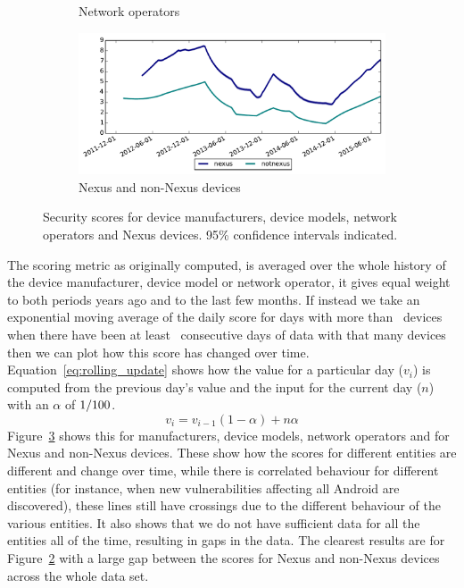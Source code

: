 \begin{figure}
\begin{subfigure}{\columnwidth}
\caption{Network operators}
\label{fig:security_score_operator}
\end{subfigure}
%
\begin{subfigure}{\columnwidth}
\includegraphics[width=\columnwidth]{figures/security_score_summary}
\caption{Nexus and non-Nexus devices}
\label{fig:security_score_summary}
\end{subfigure}
\caption{Security scores for device manufacturers, device models, network operators and Nexus devices. 95\% confidence intervals indicated.}
\label{fig:security_scores}
\end{figure}
The scoring metric as originally computed, is averaged over the whole history of the device manufacturer, device model or network operator, it gives equal weight to both periods years ago and to the last few months.
If instead we take an exponential moving average of the daily score for days with more than \daSigNumDevicesDay\, devices when there have been at least \daSigNumDays\ consecutive days of data with that many devices then we can plot how this score has changed over time.
Equation~\ref{eq:rolling_update} shows how the value for a particular day ($v_i$) is computed from the previous day's value and the input for the current day ($n$) with an $\alpha$ of $1/100$.
\begin{equation}
v_i = v_{i-1} (1 - \alpha) + n \alpha
\label{eq:rolling_update}
\end{equation}
Figure~\ref{fig:security_scores} shows this for manufacturers, device models, network operators and for Nexus and non-Nexus devices.
These show how the scores for different entities are different and change over time, while there is correlated behaviour for different entities (for instance, when new vulnerabilities affecting all Android are discovered), these lines still have crossings due to the different behaviour of the various entities.
It also shows that we do not have sufficient data for all the entities all of the time, resulting in gaps in the data.
The clearest results are for Figure~\ref{fig:security_score_summary} with a large gap between the scores for Nexus and non-Nexus devices across the whole data set.



